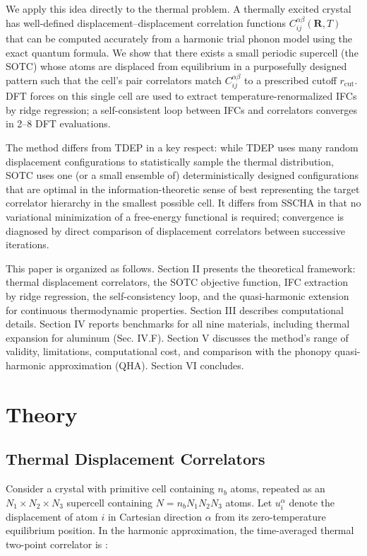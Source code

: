 \documentclass[aps,prb,reprint,amsmath,amssymb,floatfix]{revtex4-2}
\begin{document}
We apply this idea directly to the thermal problem. A thermally excited
crystal has well-defined displacement--displacement correlation
functions \(C_{ij}^{\alpha\beta}(\mathbf{R},T)\) that can be computed
accurately from a harmonic trial phonon model using the exact quantum
formula. We show that there exists a small periodic supercell (the SOTC)
whose atoms are displaced from equilibrium in a purposefully designed
pattern such that the cell's pair correlators match
\(C_{ij}^{\alpha\beta}\) to a prescribed cutoff \(r_\text{cut}\). DFT
forces on this single cell are used to extract temperature-renormalized
IFCs by ridge regression; a self-consistent loop between IFCs and
correlators converges in 2--8 DFT evaluations.

The method differs from TDEP in a key respect: while TDEP uses many
random displacement configurations to statistically sample the thermal
distribution, SOTC uses one (or a small ensemble of) deterministically
designed configurations that are optimal in the information-theoretic
sense of best representing the target correlator hierarchy in the
smallest possible cell. It differs from SSCHA in that no variational
minimization of a free-energy functional is required; convergence is
diagnosed by direct comparison of displacement correlators between
successive iterations.

This paper is organized as follows. Section II presents the theoretical
framework: thermal displacement correlators, the SOTC objective
function, IFC extraction by ridge regression, the self-consistency loop,
and the quasi-harmonic extension for continuous thermodynamic
properties. Section III describes computational details. Section IV
reports benchmarks for all nine materials, including thermal expansion
for aluminum (Sec. IV.F). Section V discusses the method's range of
validity, limitations, computational cost, and comparison with the
phonopy quasi-harmonic approximation (QHA). Section VI concludes.


\section{Theory}\label{theory}

\subsection{Thermal Displacement
Correlators}\label{thermal-displacement-correlators}

Consider a crystal with primitive cell containing \(n_b\) atoms,
repeated as an \(N_1 \times N_2 \times N_3\) supercell containing
\(N = n_b N_1 N_2 N_3\) atoms. Let \(u_i^\alpha\) denote the
displacement of atom \(i\) in Cartesian direction \(\alpha\) from its
zero-temperature equilibrium position. In the harmonic approximation,
the time-averaged thermal two-point correlator is \cite{ref13}:
\end{document}
